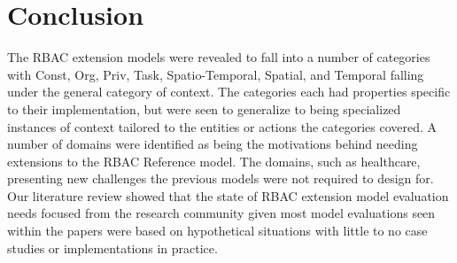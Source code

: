 \section{Conclusion} \label{sec:conclusion}

The RBAC extension models were revealed to fall into a number of categories with Const, Org, Priv, Task, Spatio-Temporal, Spatial, and Temporal falling under the general category of context. 
The categories each had properties specific to their implementation, but were seen to generalize to being specialized instances of context tailored to the entities or actions the categories covered.
A number of domains were identified as being the motivations behind needing extensions to the RBAC Reference model.  The domains, such as healthcare, presenting new challenges the previous models were not
required to design for.  Our literature review showed that the state of RBAC extension model evaluation needs focused from the research community given most model evaluations seen within the papers were
based on hypothetical situations with little to no case studies or implementations in practice.
